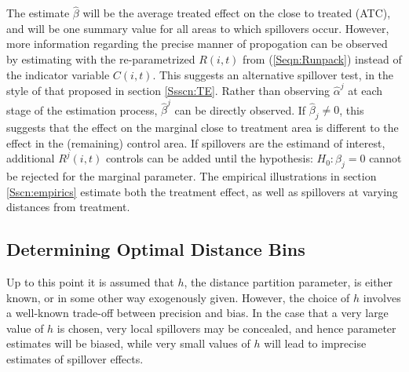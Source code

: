 \documentclass[12pt]{article}
\begin{document}
\begin{spacing}{1.3}
The estimate $\hat\beta$ will be the average treated effect on the close to 
treated (ATC), and will be one summary value for all areas to which spillovers 
occur. However, more information regarding the precise manner of propogation can 
be observed by estimating with the re-parametrized $R(i,t)$ from 
(\ref{Seqn:Runpack}) instead of the indicator variable $C(i,t)$. This suggests 
an alternative spillover test, in the style of that proposed in section 
\ref{Ssscn:TE}.  Rather than observing $\hat\alpha^j$ at each stage of the 
estimation process, $\hat\beta^j$ can be directly observed. If 
$\hat\beta_j\neq 0$, this suggests that the effect on the marginal close to 
treatment area is different to the effect in the (remaining) control area. If 
spillovers are the estimand of interest, additional $R^j(i,t)$ controls can be 
added until the hypothesis: $H_0: \beta_j = 0$ cannot be rejected for the 
marginal parameter. The empirical illustrations in section \ref{Sscn:empirics} 
estimate both the treatment effect, as well as spillovers at varying distances 
from treatment.



\subsection{Determining Optimal Distance Bins}
Up to this point it is assumed that $h$, the distance partition parameter, is
either known, or in some other way exogenously given.  However, the choice
of $h$ involves a well-known trade-off between precision and bias.  In the
case that a very large value of $h$ is chosen, very local spillovers may be
concealed, and hence parameter estimates will be biased, while very small
values of $h$ will lead to imprecise estimates of spillover effects.


\end{spacing}
\end{document}
